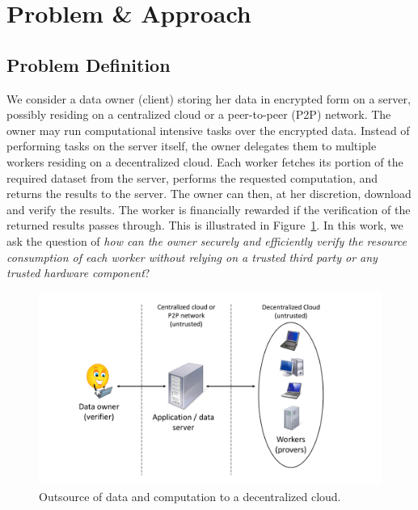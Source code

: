 \section{Problem \& Approach} \label{sect:overview}

\subsection{Problem Definition} \label{sect:problem}

We consider a data owner (client) storing her data in encrypted form on a server, possibly residing on a centralized cloud or a peer-to-peer (P2P) network.
The owner may run computational intensive tasks over the encrypted data.
Instead of performing tasks on the server itself, the owner delegates them to multiple workers residing on a decentralized cloud. 
Each worker fetches its portion of the required dataset from the server, performs the requested computation, and returns the results to the server.
The owner can then, at her discretion, download and verify the results.
The worker is financially rewarded if the verification of the returned results passes through.
This is illustrated in Figure~\ref{fig:model}.
In this work, we ask the question of {\em how can the owner securely and efficiently verify the resource consumption of each worker without relying on a trusted third party or any trusted hardware component}?

\begin{figure}[h!]\centering
  \includegraphics[scale=0.30]{model.pdf}
  \caption{Outsource of data and computation to a decentralized cloud.}
  \label{fig:model}
\end{figure}

